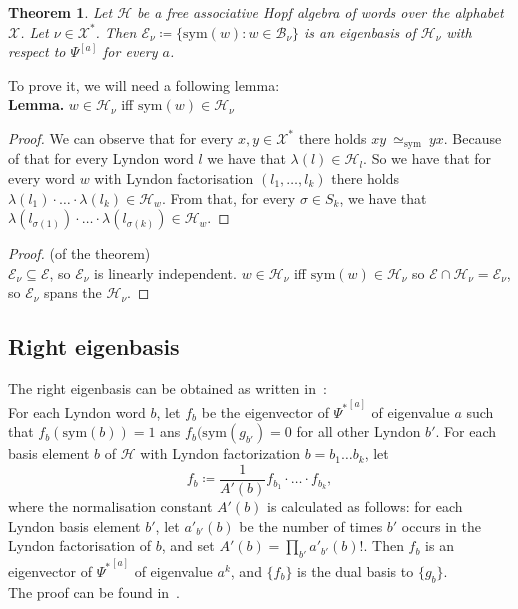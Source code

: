 \documentclass[a4paper, 12pt]{article}
\newtheorem{theorem}{Theorem}
\newcommand{\SimeqSym}{{\simeq_\mathrm{sym}}}
\begin{document}
\begin{theorem}
Let $\mathcal{H}$ be a free associative Hopf algebra of words over the alphabet $\mathcal{X}$.
Let $\nu \in \mathcal{X}^*$. Then $\mathcal{E}_\nu \coloneqq \{\mathrm{sym}(w) : w \in \mathcal{B}_\nu\}$ is
an eigenbasis of
$\mathcal{H}_\nu$ with respect to $\Psi^{[a]}$ for every $a$.
\end{theorem}

To prove it, we will need a following lemma: \\
\noindent \textbf{Lemma.} $w \in \mathcal{H}_\nu$ iff $\mathrm{sym}(w) \in \mathcal{H}_\nu$
\begin{proof}
We can observe that for every $x, y \in \mathcal{X}^*$ there holds $xy\ \SimeqSym\ yx$. Because of that
for every Lyndon word $l$ we have that $\lambda(l) \in \mathcal{H}_l$. So we have that for every word $w$
with Lyndon factorisation $(l_1,\dots, l_k)$ there holds
$\lambda(l_1)\cdot\ldots\cdot\lambda(l_k) \in \mathcal{H}_w$. From that, for every
$\sigma \in S_k$, we have that $\lambda(l_{\sigma(1)})\cdot\ldots\cdot\lambda(l_{\sigma(k)}) \in
\mathcal{H}_w$.

\end{proof}
\begin{proof}(of the theorem) \\
$\mathcal{E}_\nu \subseteq\mathcal{E}$,
so $\mathcal{E}_\nu$ is linearly independent. $w \in \mathcal{H}_\nu$ iff
$\mathrm{sym}(w) \in \mathcal{H}_\nu$ so $\mathcal{E} \cap \mathcal{H}_\nu = \mathcal{E}_\nu$, so
$\mathcal{E}_\nu$ spans the $\mathcal{H}_\nu$.
\end{proof}
\subsection{Right eigenbasis}
The right eigenbasis can be obtained as written in~\cite{Diaconis2014}: \\
For each Lyndon word $b$, let $f_b$ be the eigenvector of ${\Psi^*}^{[a]}$ of eigenvalue $a$ such that
$f_b(\mathrm{sym}(b))=1$ ans $f_b(\mathrm{sym}(g_{b'}) = 0$ for all other Lyndon $b'$. For each basis
element $b$ of $\mathcal{H}$ with Lyndon factorization $b=b_1\dots b_k$, let
\begin{equation*}
    f_b \coloneqq \frac{1}{A'(b)}f_{b_1}\cdot\ldots\cdot f_{b_k},
\end{equation*}
where the normalisation constant $A'(b)$ is calculated as follows: for each Lyndon basis element $b'$, let
$a'_{b'}(b)$ be the number of times $b'$ occurs in the Lyndon factorisation of $b$, and set $A'(b) =
\prod_{b'}a'_{b'}(b)!$. Then $f_b$ is an eigenvector of ${\Psi^*}^{[a]}$ of eigenvalue $a^k$, and $\{f_b\}$
is the dual basis to $\{g_b\}$. \\
The proof can be found in~\cite{Diaconis2014}.
\end{document}
